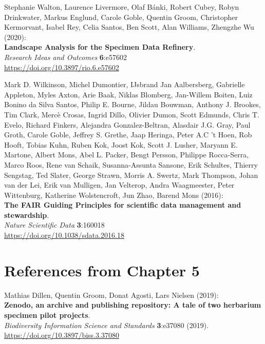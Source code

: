 \begin{thebibliography}{9}
 Stephanie Walton, Laurence Livermore, Olaf Bánki,
Robert Cubey, Robyn Drinkwater, Markus Englund, Carole Goble, Quentin
Groom, Christopher Kermorvant, Isabel Rey, Celia Santos, Ben Scott, Alan
Williams, Zhengzhe Wu (2020):\\
\textbf{Landscape Analysis for the Specimen Data Refinery}.\\
\emph{Research Ideas and Outcomes} \textbf{6}:e57602\\
\url{https://doi.org/10.3897/rio.6.e57602}

 Mark D. Wilkinson, Michel Dumontier, IJsbrand Jan
Aalbersberg, Gabrielle Appleton, Myles Axton, Arie Baak, Niklas
Blomberg, Jan-Willem Boiten, Luiz Bonino da Silva Santos, Philip E.
Bourne, Jildau Bouwman, Anthony J. Brookes, Tim Clark, Mercè Crosas,
Ingrid Dillo, Olivier Dumon, Scott Edmunds, Chris T. Evelo, Richard
Finkers, Alejandra Gonzalez-Beltran, Alasdair J.G. Gray, Paul Groth,
Carole Goble, Jeffrey S. Grethe, Jaap Heringa, Peter A.C 't Hoen, Rob
Hooft, Tobias Kuhn, Ruben Kok, Joost Kok, Scott J. Lusher, Maryann E.
Martone, Albert Mons, Abel L. Packer, Bengt Persson, Philippe
Rocca-Serra, Marco Roos, Rene van Schaik, Susanna-Assunta Sansone, Erik
Schultes, Thierry Sengstag, Ted Slater, George Strawn, Morris A. Swertz,
Mark Thompson, Johan van der Lei, Erik van Mulligen, Jan Velterop, Andra
Waagmeester, Peter Wittenburg, Katherine Wolstencroft, Jun Zhao, Barend
Mons (2016):\\
\textbf{The FAIR Guiding Principles for scientific data management and
stewardship}.\\
\emph{Nature Scientific Data} \textbf{3}:160018\\
\url{https://doi.org/10.1038/sdata.2016.18}




\section{References from Chapter 5}




 Mathias Dillen, Quentin Groom, Donat Agosti, Lars Nielsen
(2019):\\
\textbf{Zenodo, an archive and publishing repository: A tale of two
herbarium specimen pilot projects}.\\
\emph{Biodiversity Information Science and Standards} \textbf{3}:e37080
(2019).\\
\url{https://doi.org/10.3897/biss.3.37080}


\end{thebibliography}
